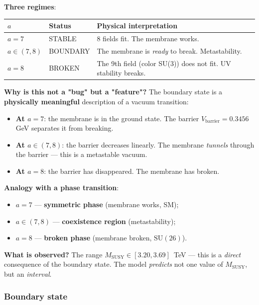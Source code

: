\documentclass[11pt,a4paper]{article}
\newcommand{\SU}{\ensuremath{\mathrm{SU}}}
\theoremstyle{definition}
\begin{document}
\medskip\noindent
\textbf{Three regimes}:
\begin{center}
\begin{tabular}{p{2cm}p{3cm}p{5cm}}
\toprule
$a$ & Status & Physical interpretation \\
\midrule
$a = 7$ & STABLE & 8 fields fit. The membrane works. \\
$a \in (7, 8)$ & BOUNDARY & The membrane is \emph{ready} to break. Metastability. \\
$a = 8$ & BROKEN & The 9th field (color SU(3)) does not fit. UV stability breaks. \\
\bottomrule
\end{tabular}
\end{center}

\medskip\noindent
\textbf{Why is this not a "bug" but a "feature"?}
The boundary state is a \textbf{physically meaningful}
description of a vacuum transition:
\begin{itemize}
    \item \textbf{At $a = 7$}: the membrane is in the ground state.
          The barrier $V_{\text{barrier}} = 0.3456$ GeV separates
          it from breaking.
    \item \textbf{At $a \in (7, 8)$}: the barrier decreases linearly.
          The membrane \emph{tunnels} through the barrier --- this is
          a metastable vacuum.
    \item \textbf{At $a = 8$}: the barrier has disappeared. The membrane has broken.
\end{itemize}

\medskip\noindent
\textbf{Analogy with a phase transition}:
\begin{itemize}
    \item $a = 7$ --- \textbf{symmetric phase} (membrane works, SM);
    \item $a \in (7, 8)$ --- \textbf{coexistence region} (metastability);
    \item $a = 8$ --- \textbf{broken phase} (membrane broken, $\SU(26)$).
\end{itemize}

\medskip\noindent
\textbf{What is observed?}
The range $M_{\text{SUSY}} \in [3.20, 3.69]$~TeV ---
this is a \emph{direct} consequence of the boundary state.
The model \emph{predicts} not one value of
$M_{\text{SUSY}}$, but an \emph{interval}.

\subsubsection{Boundary state}
\end{document}
